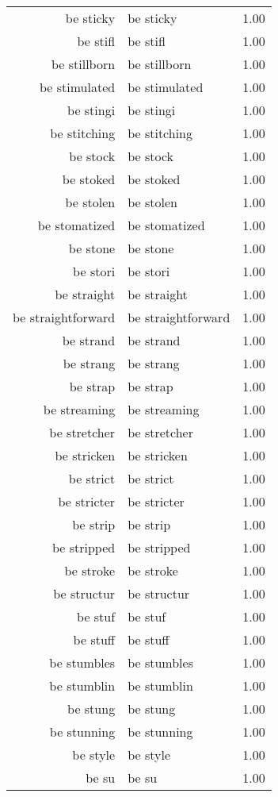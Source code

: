 \begin{table}[ht]
\begin{tabular}{rlr}
  be sticky & be sticky & 1.00 \\ 
  be stifl & be stifl & 1.00 \\ 
  be stillborn & be stillborn & 1.00 \\ 
  be stimulated & be stimulated & 1.00 \\ 
  be stingi & be stingi & 1.00 \\ 
  be stitching & be stitching & 1.00 \\ 
  be stock & be stock & 1.00 \\ 
  be stoked & be stoked & 1.00 \\ 
  be stolen & be stolen & 1.00 \\ 
  be stomatized & be stomatized & 1.00 \\ 
  be stone & be stone & 1.00 \\ 
  be stori & be stori & 1.00 \\ 
  be straight & be straight & 1.00 \\ 
  be straightforward & be straightforward & 1.00 \\ 
  be strand & be strand & 1.00 \\ 
  be strang & be strang & 1.00 \\ 
  be strap & be strap & 1.00 \\ 
  be streaming & be streaming & 1.00 \\ 
  be stretcher & be stretcher & 1.00 \\ 
  be stricken & be stricken & 1.00 \\ 
  be strict & be strict & 1.00 \\ 
  be stricter & be stricter & 1.00 \\ 
  be strip & be strip & 1.00 \\ 
  be stripped & be stripped & 1.00 \\ 
  be stroke & be stroke & 1.00 \\ 
  be structur & be structur & 1.00 \\ 
  be stuf & be stuf & 1.00 \\ 
  be stuff & be stuff & 1.00 \\ 
  be stumbles & be stumbles & 1.00 \\ 
  be stumblin & be stumblin & 1.00 \\ 
  be stung & be stung & 1.00 \\ 
  be stunning & be stunning & 1.00 \\ 
  be style & be style & 1.00 \\ 
  be su & be su & 1.00 \\ 

\end{tabular}
\end{table}
